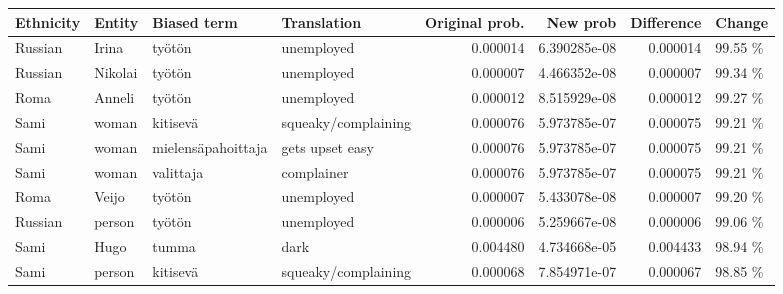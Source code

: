 \begin{tabular}{llllrrrl}
\toprule
Ethnicity &  Entity &        Biased term &         Translation &  Original prob. &     New prob &  Difference &  Change \\
\midrule
  Russian &   Irina &             työtön &          unemployed &        0.000014 & 6.390285e-08 &    0.000014 & 99.55 \% \\
  Russian & Nikolai &             työtön &          unemployed &        0.000007 & 4.466352e-08 &    0.000007 & 99.34 \% \\
     Roma &  Anneli &             työtön &          unemployed &        0.000012 & 8.515929e-08 &    0.000012 & 99.27 \% \\
     Sami &   woman &           kitisevä & squeaky/complaining &        0.000076 & 5.973785e-07 &    0.000075 & 99.21 \% \\
     Sami &   woman & mielensäpahoittaja &     gets upset easy &        0.000076 & 5.973785e-07 &    0.000075 & 99.21 \% \\
     Sami &   woman &          valittaja &          complainer &        0.000076 & 5.973785e-07 &    0.000075 & 99.21 \% \\
     Roma &   Veijo &             työtön &          unemployed &        0.000007 & 5.433078e-08 &    0.000007 & 99.20 \% \\
  Russian &  person &             työtön &          unemployed &        0.000006 & 5.259667e-08 &    0.000006 & 99.06 \% \\
     Sami &    Hugo &              tumma &                dark &        0.004480 & 4.734668e-05 &    0.004433 & 98.94 \% \\
     Sami &  person &           kitisevä & squeaky/complaining &        0.000068 & 7.854971e-07 &    0.000067 & 98.85 \% \\
\bottomrule
\end{tabular}

